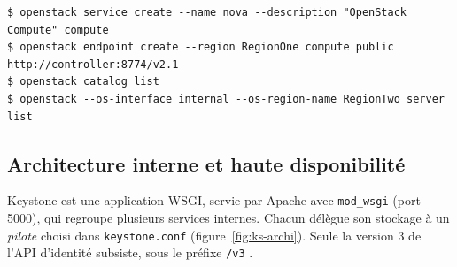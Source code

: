 \par\noindent\begin{minipage}{\linewidth}
\begin{lstlisting}[style=terminal]
$ openstack service create --name nova --description "OpenStack Compute" compute
$ openstack endpoint create --region RegionOne compute public http://controller:8774/v2.1
$ openstack catalog list
$ openstack --os-interface internal --os-region-name RegionTwo server list
\end{lstlisting}
\end{minipage}\par

\subsection{Architecture interne et haute disponibilité}\label{sec:ks-archi}

Keystone est une application WSGI, servie par Apache avec \texttt{mod\_wsgi} (port 5000), qui regroupe plusieurs services internes.
Chacun délègue son stockage à un \emph{pilote} choisi dans \texttt{keystone.conf} \parencite{keystone-architecture} (figure~\ref{fig:ks-archi}).
Seule la version 3 de l'API d'identité subsiste, sous le préfixe \texttt{/v3} \parencite{api-identity}.

